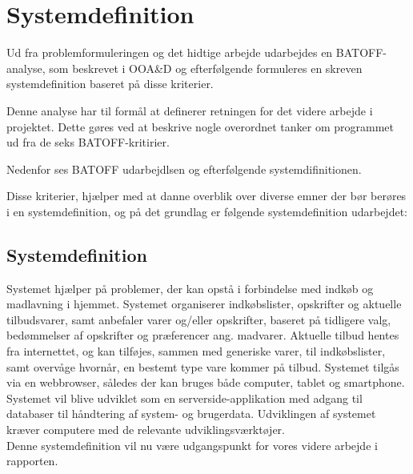 \chapter{Systemdefinition}
Ud fra problemformuleringen og det hidtige arbejde udarbejdes en BATOFF-analyse, som beskrevet i OOA\&D\citep{OOA&D2001} og efterfølgende formuleres en skreven systemdefinition baseret på disse kriterier.

Denne analyse har til formål at definerer retningen for det videre arbejde i projektet.
Dette gøres ved at beskrive nogle overordnet tanker om programmet ud fra de seks BATOFF-kritirier.

Nedenfor ses BATOFF udarbejdlsen og efterfølgende systemdifinitionen.



Disse kriterier, hjælper med at danne overblik over diverse emner der bør berøres i en systemdefinition, og på det grundlag er følgende systemdefinition udarbejdet:

\section{Systemdefinition}

Systemet hjælper på problemer, der kan opstå i forbindelse med indkøb og madlavning i hjemmet. 
Systemet organiserer indkøbslister, opskrifter og aktuelle tilbudsvarer, samt anbefaler varer og/eller opskrifter, baseret på tidligere valg, bedømmelser af opskrifter og præferencer ang. madvarer. 
Aktuelle tilbud hentes fra internettet, og kan tilføjes, sammen med generiske varer, til indkøbslister, samt overvåge hvornår, en bestemt type vare kommer på tilbud.
Systemet tilgås via en webbrowser, således der kan bruges både computer, tablet og smartphone. 
Systemet vil blive udviklet som en serverside-applikation med adgang til databaser til håndtering af system- og brugerdata. 
Udviklingen af systemet kræver computere med de relevante udviklingsværktøjer.\\

Denne systemdefinition vil nu være udgangspunkt for vores videre arbejde i rapporten.